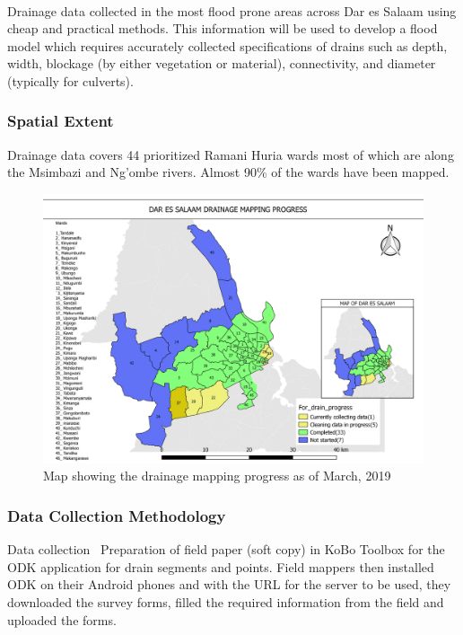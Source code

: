 \documentclass[a4paper,12pt,twoside]{article}
\begin{document}
\

Drainage data collected in the most flood prone areas across Dar es Salaam using cheap  and practical methods. This information will be used to develop a flood model which requires accurately collected specifications of drains such as depth, width, blockage (by either vegetation or material), connectivity, and diameter (typically for culverts).

\subsubsection{Spatial Extent}
Drainage data covers 44 prioritized Ramani Huria wards most of which are along the Msimbazi and Ng’ombe rivers. Almost 90\% of the wards have been mapped.

\begin{figure}[h]
  \color{RHgreen}\caption{Map showing the drainage mapping progress as of March, 2019}
  \centering
  \includegraphics[width=1\textwidth]{images/Dar_drainage_mapping_progress.png}
\end{figure}

\subsubsection{Data Collection Methodology}

{\color{RHblue} Data collection}
\
Preparation of field paper (soft copy) in KoBo Toolbox for the ODK application for drain segments and points. Field mappers then installed ODK on their Android phones and with the URL for the server to be used, they downloaded the survey forms, filled the required information from the field and uploaded the forms.
\end{document}
